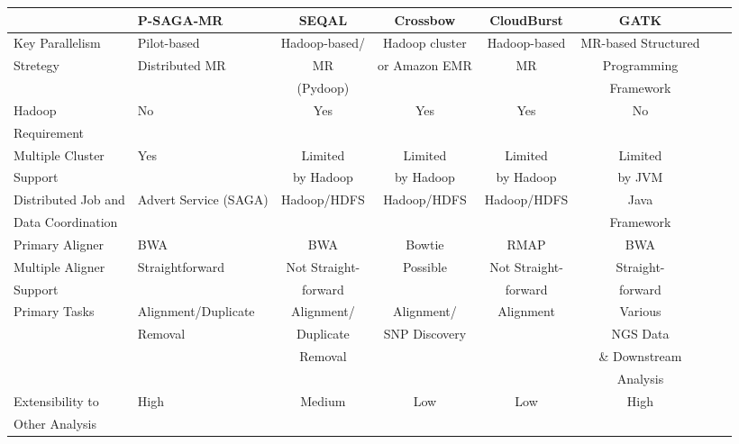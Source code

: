 \documentclass{sig-alternate}
\begin{document}
\begin{center}
\begin{table}[ht]
{\small
\hfill{}
\begin{tabular}{|l|l|c|c|c|c|c|c|}
\hline
  & \textbf{P-SAGA-MR}\cite{pmr2012} & \textbf{SEQAL}\cite{seal2011} & \textbf{Crossbow}\cite{langmead2009} & \textbf{CloudBurst}\cite{cloudburst} & \textbf{GATK}\cite{gatk} \\ \hline
 \hline 
Key Parallelism   & Pilot-based   &  Hadoop-based/  &  Hadoop cluster  & Hadoop-based & MR-based Structured \\ 
Stretegy  & Distributed MR & MR  & or Amazon EMR & MR & Programming  \\
& & (Pydoop) &  & & Framework  \\ \hline
  
Hadoop & No & Yes & Yes\footnote[1] & Yes & No \\ 
Requirement  & & & &  &\\ \hline  
  
    
Multiple  Cluster & Yes  & Limited   & Limited  & Limited  & Limited \\
Support &  & by Hadoop &  by Hadoop & by Hadoop  & by JVM   \\ \hline

Distributed Job and  & Advert Service (SAGA) & Hadoop/HDFS & Hadoop/HDFS & Hadoop/HDFS & Java \\ 
Data Coordination & &  & & & Framework\\ \hline
%

Primary Aligner &  BWA  &  BWA & Bowtie & RMAP &  BWA \\ \hline
Multiple Aligner  & Straightforward & Not Straight- & Possible & Not Straight-  & Straight-  \\ 
Support &  & forward &   & forward  & forward \\\hline
Primary Tasks & Alignment/Duplicate  & Alignment/ & Alignment/ & Alignment &Various\\
  &  Removal & Duplicate & SNP Discovery & & NGS Data  \\  
           &  &  Removal & &  & \& Downstream  \\
           &  & & &  & Analysis \\ \hline  
Extensibility to   &  High  & Medium &  Low & Low & High      \\
Other Analysis  &      &  &  &  &   \\ \hline


\end{tabular}}
\end{table}
\end{center}
\end{document}
